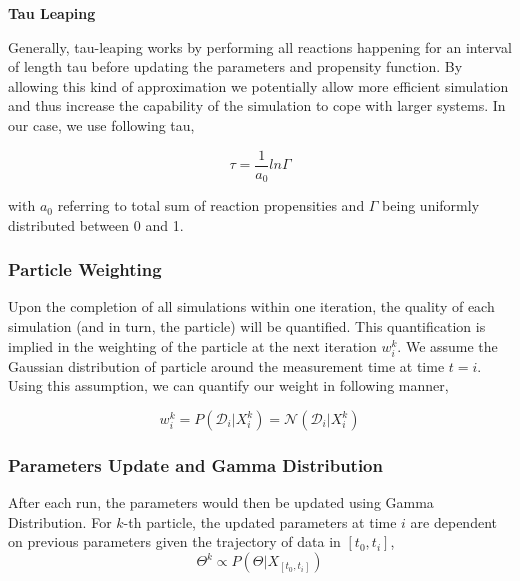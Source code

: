\documentclass{bioinfo}
\begin{document}
\textbf{Tau Leaping}

Generally, tau-leaping works by performing all reactions happening for an interval of length tau before updating the parameters and propensity function. By allowing this kind of approximation we potentially allow more efficient simulation and thus increase the capability of the simulation to cope with larger systems. In our case, we use following tau,

\begin{equation}
\tau = \frac{1}{a_0} ln \Gamma\label{eq:15}
\end{equation}

with $a_0$ referring to total sum of reaction propensities and $\Gamma$ being uniformly distributed between 0 and 1. 

\subsubsection{Particle Weighting}

Upon the completion of all simulations within one iteration, the quality of each simulation (and in turn, the particle) will be quantified. This quantification is implied in the weighting of the particle at the next iteration $w_{i}^k$. We assume the Gaussian distribution of particle around the measurement time at time $t=i$. Using this assumption, we can quantify our weight in following manner,

\begin{equation}
w_i^k = P(\mathcal{D}_i | X_i^k) = \mathcal{N}(\mathcal{D}_i | X_i^k)\label{eq:16}
\end{equation}



\subsubsection{Parameters Update and Gamma Distribution}

After each run, the parameters would then be updated using Gamma Distribution. For $k$-th particle, the updated parameters at time $i$ are dependent on previous parameters given the trajectory of data in $[t_0, t_i]$,\\

\begin{equation}
\Theta^k \propto P(\Theta | X_{[t_0, t_i]})\label{eq:17}
\end{equation}
\end{document}

